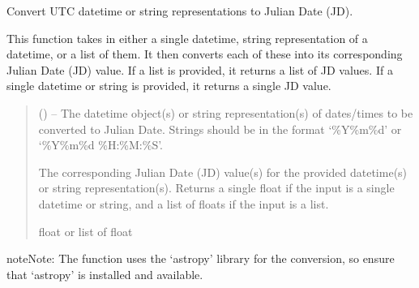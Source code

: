 \documentclass[letterpaper,10pt,english]{sphinxmanual}
\begin{document}
\begin{fulllineitems}
\label{\detokenize{fspsim.utils:fspsim.utils.Conversions.utc_to_jd}}
\pysigstartsignatures
{}
\pysigstopsignatures
\sphinxAtStartPar
Convert UTC datetime or string representations to Julian Date (JD).

\sphinxAtStartPar
This function takes in either a single datetime, string representation of a datetime, or a list of them. It then
converts each of these into its corresponding Julian Date (JD) value. If a list is provided, it returns a list of JD
values. If a single datetime or string is provided, it returns a single JD value.
\begin{quote}\begin{description}
\sphinxAtStartPar
{} (\sphinxstyleliteralemphasis{\sphinxupquote{, }}) – The datetime object(s) or string representation(s) of dates/times to be converted to Julian Date.
Strings should be in the format ‘\%Y\sphinxhyphen{}\%m\sphinxhyphen{}\%d’ or ‘\%Y\sphinxhyphen{}\%m\sphinxhyphen{}\%d \%H:\%M:\%S’.

\sphinxAtStartPar
The corresponding Julian Date (JD) value(s) for the provided datetime(s) or string representation(s).
Returns a single float if the input is a single datetime or string, and a list of floats if the input is a list.

\sphinxAtStartPar
float or list of float

\end{description}\end{quote}

\begin{sphinxadmonition}{note}{Note:}
\sphinxAtStartPar
The function uses the ‘astropy’ library for the conversion, so ensure that ‘astropy’ is installed and available.
\end{sphinxadmonition}

\end{fulllineitems}
\end{document}
